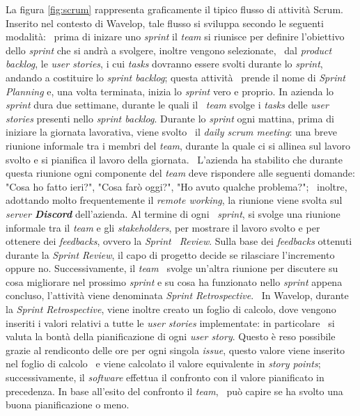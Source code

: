 La figura \ref{fig:scrum} rappresenta graficamente il tipico flusso di attività Scrum. Inserito nel contesto di Wavelop, tale flusso si sviluppa secondo le seguenti modalità: \
prima di inizare uno \emph{sprint} il \emph{team} si riunisce per definire l'obiettivo dello \emph{sprint} che si andrà a svolgere, inoltre vengono selezionate, \
dal \emph{product backlog}, le \emph{user stories}, i cui \emph{tasks} dovranno essere svolti durante lo \emph{sprint}, andando a costituire lo \emph{sprint backlog}; questa attività \
prende il nome di \emph{Sprint Planning} e, una volta terminata, inizia lo \emph{sprint} vero e proprio. In azienda lo \emph{sprint} dura due settimane, durante le quali il \
\emph{team} svolge i \emph{tasks} delle \emph{user stories} presenti nello \emph{sprint backlog}. Durante lo \emph{sprint} ogni mattina, prima di iniziare la giornata lavorativa, viene svolto \
il \emph{daily scrum meeting}: una breve riunione informale tra i membri del \emph{team}, durante la quale ci si allinea sul lavoro svolto e si pianifica il lavoro della giornata. \
L'azienda ha stabilito che durante questa riunione ogni componente del \emph{team} deve rispondere alle seguenti domande: "Cosa ho fatto ieri?", "Cosa farò oggi?", "Ho avuto qualche problema?"; \
inoltre, adottando molto frequentemente il \emph{remote working}, la riunione viene svolta sul \emph{server \textbf{Discord}} dell'azienda. Al termine di ogni \
\emph{sprint}, si svolge una riunione informale tra il \emph{team} e gli \emph{\glspl{stakeholder}}, per mostrare il lavoro svolto e per ottenere dei \emph{feedbacks}, ovvero la \emph{Sprint \
Review}. Sulla base dei \emph{feedbacks} ottenuti durante la \emph{Sprint Review}, il capo di progetto decide se rilasciare l'incremento oppure no. Successivamente, il \emph{team} \
svolge un'altra riunione per discutere su cosa migliorare nel prossimo \emph{sprint} e su cosa ha funzionato nello \emph{sprint} appena concluso, l'attività viene denominata \emph{Sprint Retrospective}. \
In Wavelop, durante la \emph{Sprint Retrospective}, viene inoltre creato un foglio di calcolo, dove vengono inseriti i valori relativi a tutte le \emph{user stories} implementate: in particolare \
si valuta la bontà della pianificazione di ogni \emph{user story}. Questo è reso possibile grazie al rendiconto delle ore per ogni singola \emph{issue}, questo valore viene inserito nel foglio di calcolo \
e viene calcolato il valore equivalente in \emph{story points}; successivamente, il \emph{software} effettua il confronto con il valore pianificato in precedenza. In base all'esito del confronto il \emph{team}, \
può capire se ha svolto una buona pianificazione o meno.

